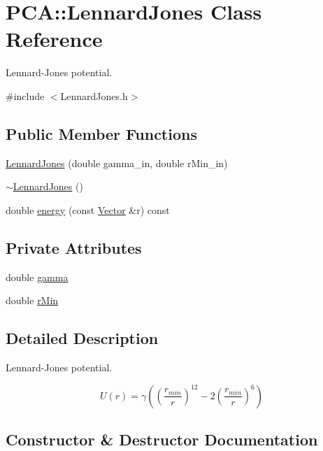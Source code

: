 \hypertarget{class_p_c_a_1_1_lennard_jones}{}\section{P\+CA\+:\+:Lennard\+Jones Class Reference}
\label{class_p_c_a_1_1_lennard_jones}


Lennard-\/\+Jones potential.  




{\ttfamily \#include $<$Lennard\+Jones.\+h$>$}

\subsection*{Public Member Functions}
\begin{DoxyCompactItemize}
\item 
\hyperlink{class_p_c_a_1_1_lennard_jones_a177de9041d696f41ac2b498973047759}{Lennard\+Jones} (double gamma\+\_\+in, double r\+Min\+\_\+in)
\item 
\hyperlink{class_p_c_a_1_1_lennard_jones_ac8acfe0ebd2e7f263d6561ab515f0028}{$\sim$\+Lennard\+Jones} ()
\item 
double \hyperlink{class_p_c_a_1_1_lennard_jones_a310360e70f05d8ca7a809823e9c01422}{energy} (const \hyperlink{class_p_c_a_1_1_vector}{Vector} \&r) const
\end{DoxyCompactItemize}
\subsection*{Private Attributes}
\begin{DoxyCompactItemize}
\item 
double \hyperlink{class_p_c_a_1_1_lennard_jones_ad28ea138038c2c43e9fd000752ea6130}{gamma}
\item 
double \hyperlink{class_p_c_a_1_1_lennard_jones_aa59f5f2bb7cf5c83a33a7f95d23ef4c8}{r\+Min}
\end{DoxyCompactItemize}


\subsection{Detailed Description}
Lennard-\/\+Jones potential. 

\[ U(r)= \gamma \left( \left(\frac{r_{min}}{r}\right)^{12} - 2 \left(\frac{r_{min}}{r}\right)^6\right)\] 

\subsection{Constructor \& Destructor Documentation}
\hypertarget{class_p_c_a_1_1_lennard_jones_a177de9041d696f41ac2b498973047759}{}\label{class_p_c_a_1_1_lennard_jones_a177de9041d696f41ac2b498973047759} 
